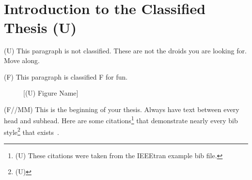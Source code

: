 %

\chapter{Introduction to the Classified Thesis (U)}

(U) This paragraph is not classified. These are not the droids you are
looking for. Move along. 

(F) This paragraph is classified F for fun.

\begin{figure}[h]
\framebox[\textwidth]{\parbox{\textwidth}{\lipsum[1]}} %
\caption{[(U) Figure Name]}
\end{figure}

(F//MM) This is the beginning of your thesis. Always have text between every head
and subhead. Here are some citations\footnote{(U) These citations were taken
from the IEEEtran example bib file.} that demonstrate nearly every bib 
style\footnote{(U) \lipsum[10]} that exists~\cite{IEEEhowto:IEEEtranpage,IEEEexample:shellCTANpage,
IEEEexample:IEEEwebsite,IEEEexample:bibtexuser,IEEEexample:bibtexdesign,
IEEEexample:tamethebeast,IEEEexample:bibtexguide,
IEEEexample:article_typical,IEEEexample:articleetal,IEEEexample:conf_typical,
IEEEexample:book_typical,IEEEexample:articlelargepages,
IEEEexample:articledualmonths,IEEEexample:TBPmisc,IEEEexample:TBParticle,
IEEEexample:bookwitheditor,IEEEexample:book,IEEEexample:bookwithseriesvolume,
IEEEexample:inbook,IEEEexample:inbookpagesnote,IEEEexample:incollection,
IEEEexample:incollectionwithseries,IEEEexample:incollection_chpp,
IEEEexample:incollectionmanyauthors,
IEEEexample:motmanualhowpub,IEEEexample:confwithadddays,
IEEEexample:confwithvolume,IEEEexample:confwithpaper,
IEEEexample:confwithpapertype,IEEEexample:presentedatconf,
IEEEexample:masters,IEEEexample:masterstype,IEEEexample:phdurl,
IEEEexample:techrep,IEEEexample:techreptype,IEEEexample:techreptypeii,
IEEEexample:techrepstdsub,IEEEexample:unpublished,IEEEexample:electronhowinfo,
IEEEexample:electronhowinfo2,IEEEexample:electronorgadd,IEEEexample:uspat,
IEEEexample:jppat,IEEEexample:frenchpatreq,IEEEexample:periodical,
IEEEexample:standard,IEEEexample:standardproposed,IEEEexample:draftasmisc,
IEEEexample:miscforum,IEEEexample:whitepaper,IEEEexample:datasheet,
IEEEexample:private,IEEEexample:miscrfc,IEEEexample:softmanual,
IEEEexample:softonline,IEEEexample:miscgermanreg,IEEEexample:bluebookstandard
}.


